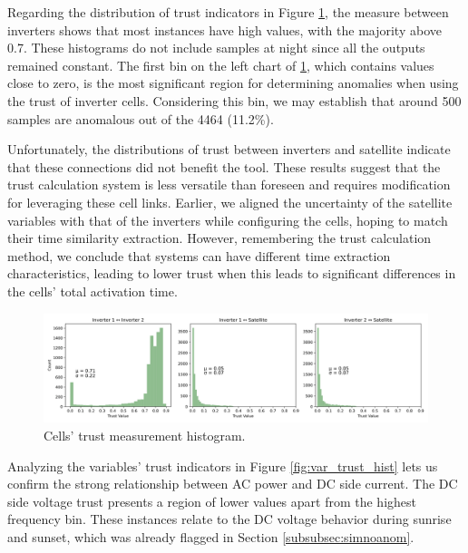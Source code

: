 Regarding the distribution of trust indicators in Figure \ref{fig:cell_trust_hist}, the measure between inverters shows that most instances have high values, with the majority above 0.7. These histograms do not include samples at night since all the outputs remained constant. The first bin on the left chart of \ref{fig:cell_trust_hist}, which contains values close to zero, is the most significant region for determining anomalies when using the trust of inverter cells. Considering this bin, we may establish that around 500 samples are anomalous out of the 4464 (11.2\%).

Unfortunately, the distributions of trust between inverters and satellite indicate that these connections did not benefit the tool. These results suggest that the trust calculation system is less versatile than foreseen and requires modification for leveraging these cell links. Earlier, we aligned the uncertainty of the satellite variables with that of the inverters while configuring the cells, hoping to match their time similarity extraction. However, remembering the trust calculation method, we conclude that systems can have different time extraction characteristics, leading to lower trust when this leads to significant differences in the cells' total activation time.

\begin{figure}[h!]
    \centering
    \includegraphics[width=\textwidth]{figures/chapter5/results/real/50_hist_trust_cells-1.png}
    \caption{Cells' trust measurement histogram.}
    \label{fig:cell_trust_hist}
\end{figure}

Analyzing the variables' trust indicators in Figure \ref{fig:var_trust_hist} lets us confirm the strong relationship between AC power and DC side current. The DC side voltage trust presents a region of lower values apart from the highest frequency bin. These instances relate to the DC voltage behavior during sunrise and sunset, which was already flagged in Section \ref{subsubsec:simnoanom}.


